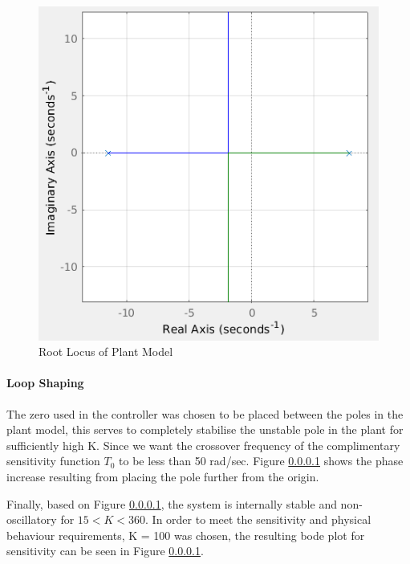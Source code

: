 \documentclass[11pt, a4paper,twocolumn]{article}
\begin{document}
		\begin{figure}[h!]
			\centering
			\includegraphics[scale=0.4]{rlocus_plant}
			\caption{Root Locus of Plant Model}
			\label{fig:rl_plnt}
		\end{figure}
						
			
	\paragraph{		Loop Shaping\\		}
			The zero used in the controller was chosen to be placed between the poles in the plant model, this serves to completely stabilise the unstable pole in the plant for sufficiently high K. Since we want the crossover frequency of the complimentary sensitivity function $T_0$ to be less than 50 rad/sec. Figure \ref{} shows the phase increase resulting from placing the pole further from the origin.
			
			
			Finally, based on Figure \ref{}, the system is internally stable and non-oscillatory for $ 15 < K < 360 $. In order to meet the sensitivity and physical behaviour requirements, K = 100 was chosen, the resulting bode plot for sensitivity can be seen in Figure \ref{}. 
			
\end{document}
